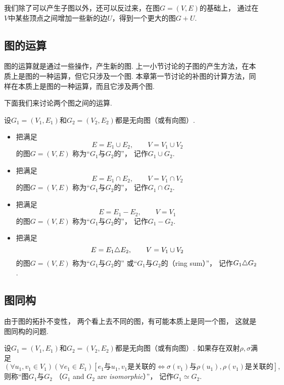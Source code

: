 我们除了可以产生子图以外，还可以反过来，在图\(G = (V,E)\)的基础上，
通过在\(V\)中某些顶点之间增加一些新的边\(U\)，得到一个更大的图\(G + U\).

\subsection{图的运算}
图的运算就是通过一些操作，产生新的图.
上一小节讨论的子图的产生方法，在本质上是图的一种运算，但它只涉及一个图.
本章第一节讨论的补图的计算方法，同样在本质上是图的一种运算，而且它涉及两个图.

下面我们来讨论两个图之间的运算.
\begin{definition}
设\(G_1 = (V_1,E_1)\)和\(G_2 = (V_2,E_2)\)都是无向图（或有向图）.
\begin{itemize}
	\item 把满足\[
		E = E_1 \cup E_2,
		\qquad
		V = V_1 \cup V_2
	\]的图\(G = (V,E)\)
	称为“\(G_1\)与\(G_2\)的”，
	记作\(G_1 \cup G_2\).

	\item 把满足\[
		E = E_1 \cap E_2,
		\qquad
		V = V_1 \cap V_2
	\]的图\(G = (V,E)\)
	称为“\(G_1\)与\(G_2\)的”，
	记作\(G_1 \cap G_2\).

	\item 把满足\[
		E = E_1 - E_2,
		\qquad
		V = V_1
	\]的图\(G = (V,E)\)
	称为“\(G_1\)与\(G_2\)的”，
	记作\(G_1 - G_2\).

	\item 把满足\[
		E = E_1 \triangle E_2,
		\qquad
		V = V_1 \cup V_2
	\]的图\(G = (V,E)\)
	称为“\(G_1\)与\(G_2\)的”
	或“\(G_1\)与\(G_2\)的（ring sum）”，
	记作\(G_1 \triangle G_2\).
\end{itemize}
\end{definition}

\subsection{图同构}
由于图的拓扑不变性，
两个看上去不同的图，有可能本质上是同一个图，
这就是图同构的问题.

\begin{definition}
设\(G_1 = (V_1,E_1)\)和\(G_2 = (V_2,E_2)\)都是无向图（或有向图）.
如果存在双射\(\rho,\sigma\)满足\begin{equation*}
	(\forall u_1,v_1 \in V_1)
	(\forall e_1 \in E_1)
	\left[
		\text{$e_1$与$u_1,v_1$是关联的}
		\iff
		\text{$\sigma(v_1)$与$\rho(u_1),\rho(v_1)$是关联的}
	\right],
\end{equation*}
则称“图\(G_1\)与\(G_2\) %
（\(G_1\) and \(G_2\) are \emph{isomorphic}）”，
记作\(G_1 \simeq G_2\).
\end{definition}

